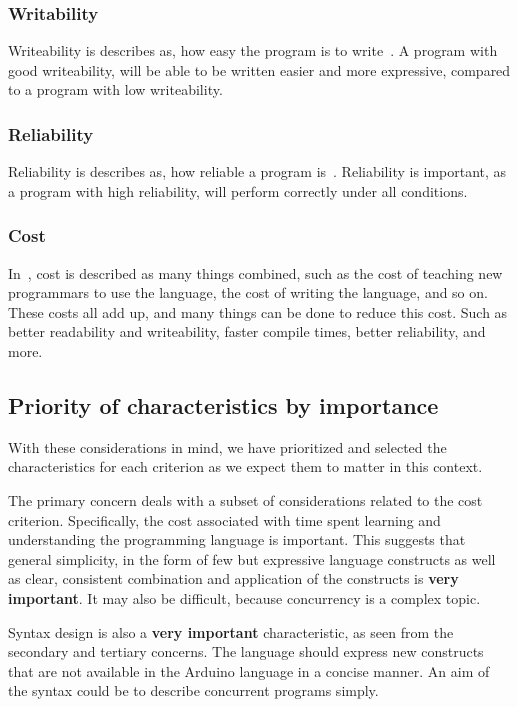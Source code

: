 \subsubsection{Writability}
Writeability is describes as, how easy the program is to write~\cite{Sebesta2016}. A program with good writeability, will be able to be written easier and more expressive, compared to a program with low writeability.

\subsubsection{Reliability}
Reliability is describes as, how reliable a program is~\cite{Sebesta2016}. Reliability is important, as a program with high reliability, will perform correctly under all conditions.

\subsubsection{Cost}
In~, cost is described as many things combined, such as the cost of teaching new programmars to use the language, the cost of writing the language, and so on. These costs all add up, and many things can be done to reduce this cost. Such as better readability and writeability, faster compile times, better reliability, and more.

\subsection{Priority of characteristics by importance}
With these considerations in mind, we have prioritized and selected the characteristics for each criterion as we expect them to matter in this context.

The primary concern deals with a subset of considerations related to the cost criterion. Specifically, the cost associated with time spent learning and understanding the programming language is important. This suggests that general simplicity, in the form of few but expressive language constructs as well as clear, consistent combination and application of the constructs is \textbf{very important}. It may also be difficult, because concurrency is a complex topic.

Syntax design is also a \textbf{very important} characteristic, as seen from the secondary and tertiary concerns. The language should express new constructs that are not available in the Arduino language in a concise manner. An aim of the syntax could be to describe concurrent programs simply. 

